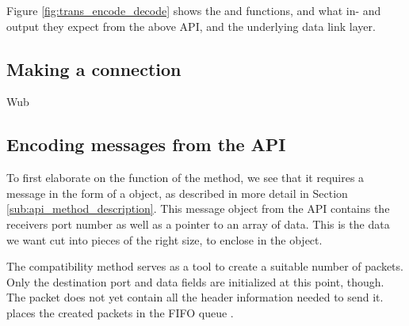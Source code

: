 Figure \ref{fig:trans_encode_decode} shows the  and  functions, and what in- and output they expect from the above API, and the underlying data link layer.


\subsection{Making a connection}
Wub


\subsection{Encoding messages from the API}
To first elaborate on the function of the  method, we see that it requires a message in the form of a  object, as described in more detail in Section \ref{sub:api_method_description}. This message object from the API contains the receivers port number as well as a pointer to an array of data. This is the data we want cut into pieces of the right size, to enclose in the  object.

The compatibility method  serves as a tool to create a suitable number of packets. Only the destination port and data fields are initialized at this point, though. The packet does not yet contain all the header information needed to send it.  places the created packets in the FIFO queue .

